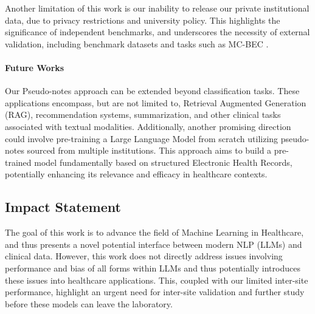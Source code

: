 \documentclass{article}
\theoremstyle{plain}
\theoremstyle{definition}
\theoremstyle{remark}
\begin{document}
{Another limitation of this work is our inability to release our private institutional data, due to privacy restrictions and university policy. This highlights the significance of independent benchmarks, and underscores the necessity of external validation, including benchmark datasets and tasks such as MC-BEC \citep{chen2023multimodal}.
\paragraph{Future Works}
Our Pseudo-notes approach can be extended beyond classification tasks. These applications encompass, but are not limited to, Retrieval Augmented Generation (RAG), recommendation systems, summarization, and other clinical tasks associated with textual modalities. Additionally, another promising direction could involve pre-training a Large Language Model from scratch utilizing pseudo-notes sourced from multiple institutions. This approach aims to build a pre-trained model fundamentally based on structured Electronic Health Records, potentially enhancing its relevance and efficacy in healthcare contexts.

\subsection{Impact Statement}

The goal of this work is to advance the field of Machine Learning in Healthcare, and thus presents a novel potential interface between modern NLP (LLMs) and clinical data. However, this work does not directly address issues involving performance and bias of all forms within LLMs and thus potentially introduces these issues into healthcare applications. This, coupled with our limited inter-site performance, highlight an urgent need for inter-site validation and further study before these models can leave the laboratory. 

}
\end{document}
